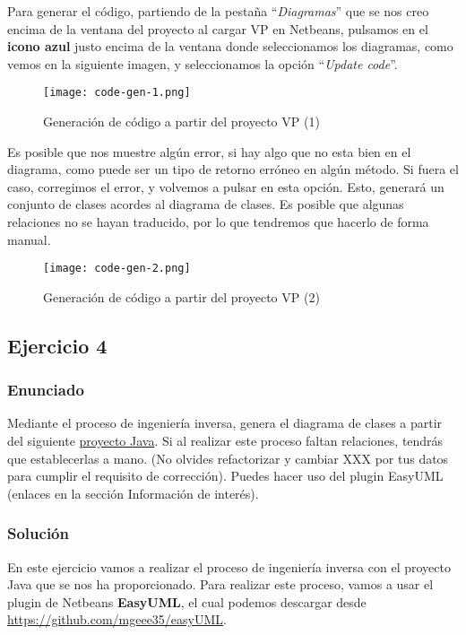 Para generar el código, partiendo de la pestaña ``\textit{Diagramas}'' que se nos creo encima de la ventana del proyecto al cargar VP en Netbeans, pulsamos en el \textbf{icono azul} justo encima de la ventana donde seleccionamos los diagramas, como vemos en la siguiente imagen, y seleccionamos la opción ``\textit{Update code}''.

\begin{figure}[H]
    \centering
    \texttt{[image: code-gen-1.png]}
    \caption{Generación de código a partir del proyecto VP (1)}
\end{figure}

Es posible que nos muestre algún error, si hay algo que no esta bien en el diagrama, como puede ser un tipo de retorno erróneo en algún método. Si fuera el caso, corregimos el error, y volvemos a pulsar en esta opción. Esto, generará un conjunto de clases acordes al diagrama de clases.  Es posible que algunas relaciones no se hayan traducido, por lo que tendremos que hacerlo de forma manual.

\begin{figure}[H]
    \centering
    \texttt{[image: code-gen-2.png]}
    \caption{Generación de código a partir del proyecto VP (2)}
\end{figure}

\subsection{Ejercicio 4}

\subsubsection{Enunciado}
Mediante el proceso de ingeniería inversa, genera el diagrama de clases a partir del siguiente \href{https://www.juntadeandalucia.es/educacion/gestionafp/datos/tareas/DAM/ED_22878/2022-23/DAM_ED_5_2022-23_Individual__968293/ingenieriaInversa_XXX2223.zip}{proyecto Java}. Si al realizar este proceso faltan relaciones, tendrás que establecerlas a mano.  (No olvides refactorizar y cambiar XXX por tus datos para cumplir el requisito de corrección). Puedes hacer uso del plugin EasyUML (enlaces en la sección Información de interés).

\subsubsection{Solución}
En este ejercicio vamos a realizar el proceso de ingeniería inversa con el proyecto Java que se nos ha proporcionado. Para realizar este proceso, vamos a usar el plugin de Netbeans \textbf{EasyUML}, el cual podemos descargar desde \url{https://github.com/mgeee35/easyUML}.

